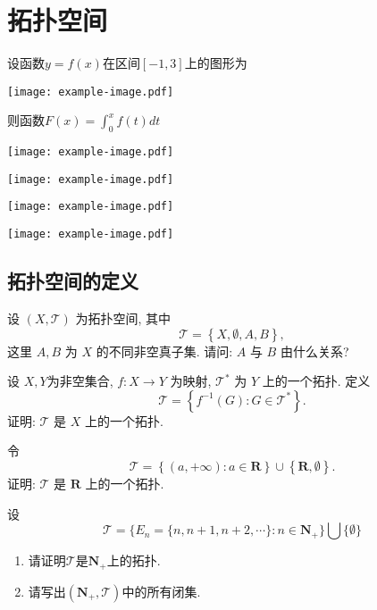 
\chapter{拓扑空间}

\begin{exercise}[date=2009-03] 设函数$y=f(x)$在区间$[-1,3]$上的图形为
  \begin{center}
  \texttt{[image: example-image.pdf]}
  \end{center}
  则函数$\displaystyle F(x)=\int_{0}^x f(t)dt$ \paren
  \begin{choices}
    \item 
    \texttt{[image: example-image.pdf]}
    \item 
    \texttt{[image: example-image.pdf]}
    \item 
    \texttt{[image: example-image.pdf]}
    \item 
    \texttt{[image: example-image.pdf]}
  \end{choices}
\end{exercise}

\section{拓扑空间的定义}

\begin{exercise} 
  设 $(X, \mathscr{T})$ 为拓扑空间, 其中
  \[\mathscr{T}=\left\{X, \emptyset, A,B\right\},\]
  这里 $A,B$ 为 $X$ 的不同非空真子集.  请问: $A$ 与 $B$ 由什么关系?
\end{exercise}
  
\begin{exercise}
 设 $X,Y$为非空集合, $f: X\to Y$ 为映射, $\mathscr{T}^{\ast}$ 为 $Y$ 上的一个拓扑. 定义
  \[\mathscr{T}=\left\{f^{-1}\left(G\right): G\in \mathscr{T}^{\ast}\right\}.\]
  证明: $\mathscr{T}$ 是 $X$ 上的一个拓扑.
\end{exercise}
  
\begin{exercise}	
  令
  \[\mathscr{T}=\left\{(a,+\infty):a\in\mathbf{R}\right\}\cup\left\{\mathbf{R}, \emptyset\right\}.\]
  证明:  $\mathscr{T}$ 是 $\mathbf{R}$ 上的一个拓扑.
\end{exercise}
  
\begin{exercise}	
  设
  $$\mathscr{T}=\{E_n=\{n, n+1, n+2, \cdots\}: n\in \mathbf{N}_+\}\bigcup\{\emptyset\}$$
  \begin{enumerate}
    \item 请证明$\mathscr{T}$是$\mathbf{N}_+$上的拓扑.
    \item 请写出$(\mathbf{N}_+,\mathscr{T})$中的所有闭集.
  \end{enumerate}
\end{exercise}

